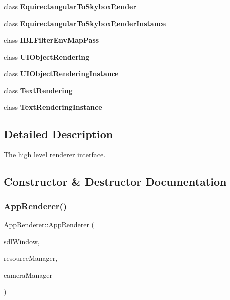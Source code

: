 \begin{DoxyCompactItemize}
class {\bfseries Equirectangular\+To\+Skybox\+Render}
\item 
\mbox{\label{classAppRenderer_a2ed53da06aa8c96971b58644b85ea2d3}} 
class {\bfseries Equirectangular\+To\+Skybox\+Render\+Instance}
\item 
\mbox{\label{classAppRenderer_afeb3653020f8cc65d4b08c7ea9559a43}} 
class {\bfseries I\+B\+L\+Filter\+Env\+Map\+Pass}
\item 
\mbox{\label{classAppRenderer_a931e3cacb3eb1341332fd7477decd15d}} 
class {\bfseries U\+I\+Object\+Rendering}
\item 
\mbox{\label{classAppRenderer_af8087aef5ebe8f9a42bfabe1e0672728}} 
class {\bfseries U\+I\+Object\+Rendering\+Instance}
\item 
\mbox{\label{classAppRenderer_a4708d497b34a7f0c5e0a38cfa536a26c}} 
class {\bfseries Text\+Rendering}
\item 
\mbox{\label{classAppRenderer_a5532c3b535b4f2a814054dba701936df}} 
class {\bfseries Text\+Rendering\+Instance}
\end{DoxyCompactItemize}


\subsection{Detailed Description}
The high level renderer interface. 

\subsection{Constructor \& Destructor Documentation}
\mbox{\label{classAppRenderer_a01b9e6fe7b454466ea00c81d0eb8a89c}} 
\subsubsection{\texorpdfstring{App\+Renderer()}{AppRenderer()}}
{\footnotesize\ttfamily App\+Renderer\+::\+App\+Renderer (\begin{DoxyParamCaption}\item[{S\+D\+L\+\_\+\+Window \&}]{sdl\+Window,  }\item[{\hyperlink{classResourceManager}{Resource\+Manager} $\ast$}]{resource\+Manager,  }\item[{\hyperlink{classCameraManager}{Camera\+Manager} $\ast$}]{camera\+Manager }\end{DoxyParamCaption})}




